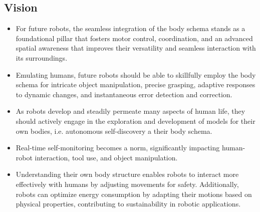 \documentclass[12pt, a4paper]{article}
\begin{document}
\begin{enumerate}
%

\subsection*{Vision}

\begin{itemize}
	\item For future robots, the seamless integration of the body schema stands as a foundational pillar that fosters motor control, coordination, and an advanced spatial awareness that improves their versatility and seamless interaction with its surroundings.

	\item Emulating humans, future robots should be able to skillfully employ the body schema for intricate object manipulation, precise grasping, adaptive responses to dynamic changes, and instantaneous error detection and correction.
	
	\item As robots develop and steadily permeate many aspects of human life, they should actively engage in the exploration and development of models for their own bodies, i.e. autonomous self-discovery a their body schema. %
	
	\item Real-time self-monitoring becomes a norm, significantly impacting human-robot interaction, tool use, and object manipulation.
	
	\item Understanding their own body structure enables robots to interact more effectively with humans by adjusting movements for safety. Additionally, robots can optimize energy consumption by adapting their motions based on physical properties, contributing to sustainability in robotic applications.
\end{itemize}


\end{enumerate}
\end{document}
